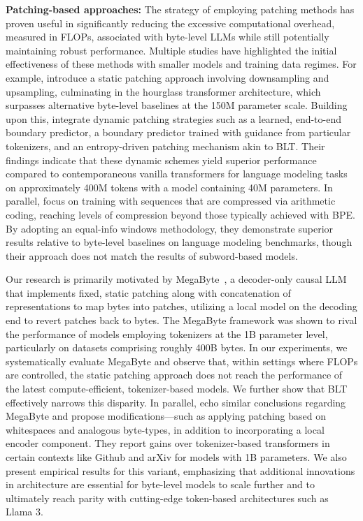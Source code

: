 \textbf{Patching-based approaches:} The strategy of employing patching methods has proven useful in significantly reducing the excessive computational overhead, measured in FLOPs, associated with byte-level LLMs while still potentially maintaining robust performance. Multiple studies have highlighted the initial effectiveness of these methods with smaller models and training data regimes. For example, \cite{nawrot-etal-2022-hierarchical} introduce a static patching approach involving downsampling and upsampling, culminating in the hourglass transformer architecture, which surpasses alternative byte-level baselines at the 150M parameter scale. Building upon this, \cite{nawrot-etal-2023-efficient} integrate dynamic patching strategies such as a learned, end-to-end boundary predictor, a boundary predictor trained with guidance from particular tokenizers, and an entropy-driven patching mechanism akin to {\textsc BLT}. Their findings indicate that these dynamic schemes yield superior performance compared to contemporaneous vanilla transformers for language modeling tasks on approximately 400M tokens with a model containing 40M parameters. In parallel, \cite{lester2024training} focus on training with sequences that are compressed via arithmetic coding, reaching levels of compression beyond those typically achieved with BPE. By adopting an equal-info windows methodology, they demonstrate superior results relative to byte-level baselines on language modeling benchmarks, though their approach does not match the results of subword-based models.

Our research is primarily motivated by MegaByte~\citep{yu2023megabyte}, a decoder-only causal LLM that implements fixed, static patching along with concatenation of representations to map bytes into patches, utilizing a local model on the decoding end to revert patches back to bytes. The MegaByte framework was shown to rival the performance of models employing tokenizers at the 1B parameter level, particularly on datasets comprising roughly 400B bytes. In our experiments, we systematically evaluate MegaByte and observe that, within settings where FLOPs are controlled, the static patching approach does not reach the performance of the latest compute-efficient, tokenizer-based models. We further show that {\textsc BLT} effectively narrows this disparity. In parallel, \cite{slagle2024spacebyte} echo similar conclusions regarding MegaByte and propose modifications—such as applying patching based on whitespaces and analogous byte-types, in addition to incorporating a local encoder component. They report gains over tokenizer-based transformers in certain contexts like Github and arXiv for models with 1B parameters. We also present empirical results for this variant, emphasizing that additional innovations in architecture are essential for byte-level models to scale further and to ultimately reach parity with cutting-edge token-based architectures such as Llama 3.

